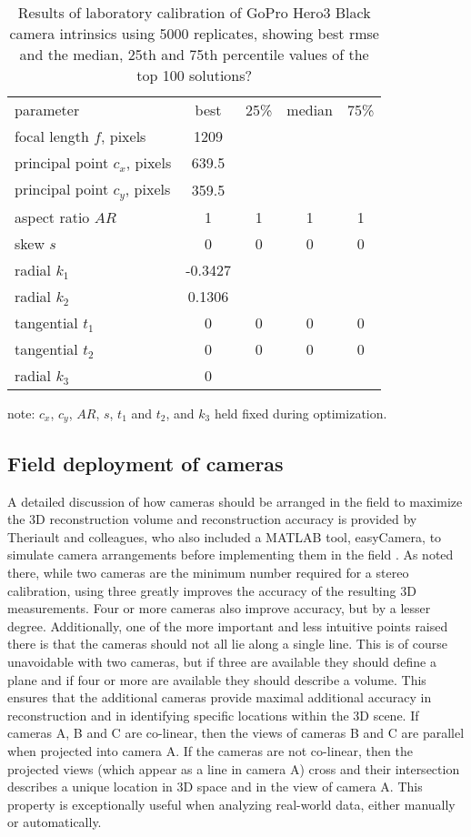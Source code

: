 \documentclass[fleqn,10pt]{wlpeerj}
\begin{document}
\begin{table}
\caption{Results of laboratory calibration of GoPro Hero3 Black camera intrinsics using 5000 replicates, showing best rmse and the median, 25th and 75th percentile values of the top 100 solutions? }
\label{tab:labcal2}
\begin{center}
\begin{tabular}{lcccc}
parameter & best & 25\% & median & 75\% \\
\cline{1-5}
focal length $f$, pixels & 1209 & & &\\
principal point $c_x$, pixels & 639.5 & & & \\
principal point $c_y$, pixels & 359.5 & & & \\
aspect ratio $AR$ & 1 & 1 & 1 & 1\\skew $s$ & 0 & 0 & 0 & 0 \\
radial $k_1$ & -0.3427 & & & \\
radial $k_2$ & 0.1306 & & & \\
tangential $t_1$ & 0 & 0 & 0 & 0 \\
tangential $t_2$ & 0 & 0 & 0 & 0 \\
radial $k_3$ & 0 & & & \\
\end{tabular}
\end{center}
note: $c_x$, $c_y$, $AR$, $s$, $t_1$ and $t_2$, and $k_3$ held fixed during optimization.
\end{table}

\subsection*{Field deployment of cameras}
A detailed discussion of how cameras should be arranged in the field to maximize the 3D reconstruction volume and reconstruction accuracy is provided by Theriault and colleagues, who also included a MATLAB tool, easyCamera, to simulate camera arrangements before implementing them in the field \citep{Theriault:2014}. As noted there, while two cameras are the minimum number required for a stereo calibration, using three greatly improves the accuracy of the resulting 3D measurements.  Four or more cameras also improve accuracy, but by a lesser degree. Additionally, one of the more important and less intuitive points raised there is that the cameras should not all lie along a single line. This is of course unavoidable with two cameras, but if three are available they should define a plane and if four or more are available they should describe a volume. This ensures that the additional cameras provide maximal additional accuracy in reconstruction and in identifying specific locations within the 3D scene. If cameras A, B and C are co-linear, then the views of cameras B and C are parallel when projected into camera A.  If the cameras are not co-linear, then the projected views (which appear as a line in camera A) cross and their intersection describes a unique location in 3D space and in the view of camera A. This property is exceptionally useful when analyzing real-world data, either manually or automatically.
\end{document}
